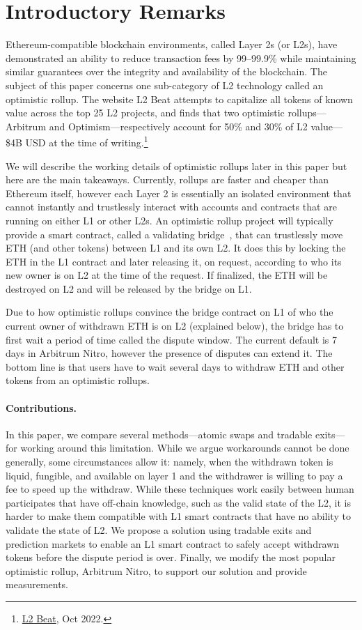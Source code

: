 \section{Introductory Remarks}

Ethereum-compatible blockchain environments, called Layer 2s (or L2s), have demonstrated an ability to reduce transaction fees by 99--99.9\% while maintaining similar guarantees over the integrity and availability of the blockchain. The subject of this paper concerns one sub-category of L2 technology called an optimistic rollup. The website L2 Beat attempts to capitalize all tokens of known value across the top 25 L2 projects, and finds that two optimistic rollups---Arbitrum and Optimism---respectively account for 50\% and 30\% of L2 value---\$4B USD at the time of writing.\footnote{\href{https://l2beat.com/scaling/tvl/}{L2 Beat}, Oct 2022.}

We will describe the working details of optimistic rollups later in this paper but here are the main takeaways. Currently, rollups are faster and cheaper than Ethereum itself, however each Layer 2 is essentially an isolated environment that cannot instantly and trustlessly interact with accounts and contracts that are running on either L1 or other L2s. An optimistic rollup project will typically provide a smart contract, called a validating bridge~\cite{}, that can trustlessly move ETH (and other tokens) between L1 and its own L2. It does this by locking the ETH in the L1 contract and later releasing it, on request, according to who its new owner is on L2 at the time of the request. If finalized, the ETH will be destroyed on L2 and will be released by the bridge on L1.

Due to how optimistic rollups convince the bridge contract on L1 of who the current owner of withdrawn ETH is on L2 (explained below), the bridge has to first wait a period of time called the dispute window. The current default is 7 days in Arbitrum Nitro, however the presence of disputes can extend it. The bottom line is that users have to wait several days to withdraw ETH and other tokens from an optimistic rollups. 

\paragraph{Contributions.} In this paper, we compare several methods---atomic swaps and tradable exits---for working around this limitation. While we argue workarounds cannot be done generally, some circumstances allow it: namely, when the withdrawn token is liquid, fungible, and available on layer 1 and the withdrawer is willing to pay a fee to speed up the withdraw. While these techniques work easily between human participates that have off-chain knowledge, such as the valid state of the L2, it is harder to make them compatible with L1 smart contracts that have no ability to validate the state of L2. We propose a solution using tradable exits and prediction markets to enable an L1 smart contract to safely accept withdrawn tokens before the dispute period is over. Finally, we modify the most popular optimistic rollup, Arbitrum Nitro, to support our solution and provide measurements. 
 
